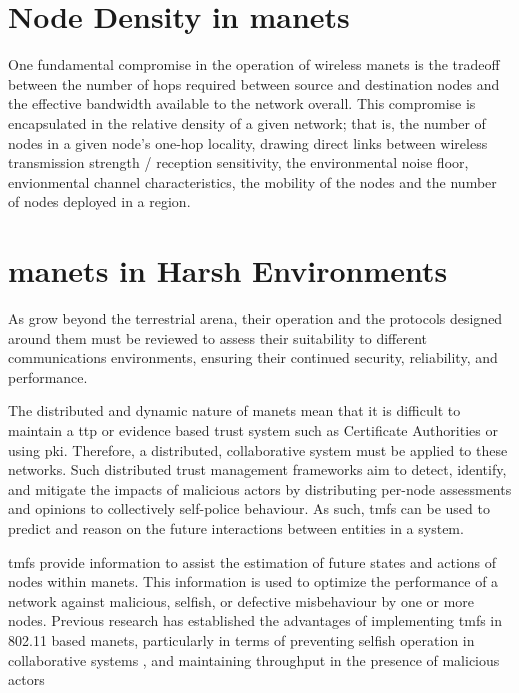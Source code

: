 \section{Node Density in \glspl{manet}}

One fundamental compromise in the operation of wireless \glspl{manet} is the tradeoff between the number of hops required between source and destination nodes and the effective bandwidth available to the network overall\cite{Royer2001}.
This compromise is encapsulated in the relative density of a given network; that is, the number of nodes in a given node's one-hop locality, drawing direct links between wireless transmission strength / reception sensitivity, the environmental noise floor, envionmental channel characteristics, the mobility of the nodes and the number of nodes deployed in a region.




\section{\glspl{manet} in Harsh Environments}

As  grow beyond the terrestrial arena, their operation and the protocols designed around them must be reviewed to assess their suitability to different communications environments, ensuring their continued security, reliability, and performance.

The distributed and dynamic nature of \glspl{manet} mean that it is difficult to maintain a \gls{ttp} or evidence based trust system such as Certificate Authorities or using \gls{pki}.
Therefore, a distributed, collaborative system must be applied to these networks.
Such distributed trust management frameworks aim to detect, identify, and mitigate the impacts of malicious actors by distributing per-node assessments and opinions to collectively self-police behaviour.
As such, \glspl{tmf} can be used to predict and reason on the future interactions between entities in a system.

\glspl{tmf} provide information to assist the estimation of future states and actions of nodes within \glspl{manet}.
This information is used to optimize the performance of a network against malicious, selfish, or defective misbehaviour by one or more nodes.
Previous research has established the advantages of implementing \glspl{tmf} in 802.11 based \glspl{manet}, particularly in terms of preventing selfish operation in collaborative systems \cite{Li2007}, and maintaining throughput in the presence of malicious actors \cite{Buchegger2002}

